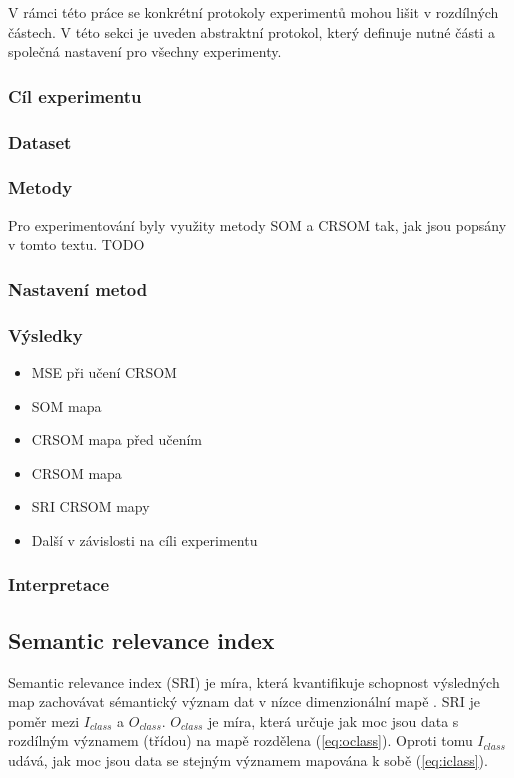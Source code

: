 \documentclass[thesis=M,czech]{FITthesis}[2012/06/26]
\begin{document}
V rámci této práce se konkrétní protokoly experimentů mohou lišit v rozdílných částech. V této sekci je uveden abstraktní protokol, který definuje nutné části a společná nastavení pro všechny experimenty.

\subsubsection*{Cíl experimentu}

\subsubsection*{Dataset}

\subsubsection*{Metody}
Pro experimentování byly využity metody SOM a CRSOM tak, jak jsou popsány v tomto textu. TODO


\subsubsection*{Nastavení metod}


\subsubsection*{Výsledky}

    \begin{itemize}
        \item MSE při učení CRSOM
        \item SOM mapa
        \item CRSOM mapa před učením
        \item CRSOM mapa
        \item SRI CRSOM mapy
        \item Další v závislosti na cíli experimentu
    \end{itemize}

\subsubsection*{Interpretace}


\subsection{Semantic relevance index}
Semantic relevance index (SRI) je míra, která kvantifikuje schopnost výsledných map zachovávat sémantický význam dat v nízce dimenzionální mapě \cite{hartono14}. SRI je poměr mezi $I_{class}$ a $O_{class}$. $O_{class}$ je míra, která určuje jak moc jsou data s rozdílným významem (třídou) na mapě rozdělena (\ref{eq:oclass}). Oproti tomu $I_{class}$ udává, jak moc jsou data se stejným významem mapována k sobě (\ref{eq:iclass}).
\end{document}

